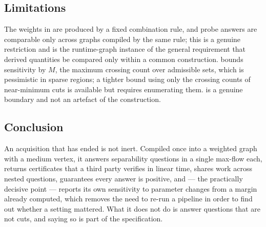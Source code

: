 \documentclass[11pt,a4paper]{article}
\theoremstyle{definition}
\theoremstyle{remark}
\begin{document}
\subsection{Limitations}

The weights in  are produced by a fixed combination rule,
and probe answers are comparable only across graphs compiled by the same
rule; this is a genuine restriction and is the runtime-graph instance of
the general requirement that derived quantities be compared only within a
common construction.  bounds sensitivity by $M$,
the maximum crossing count over admissible sets, which is pessimistic in
sparse regions; a tighter bound using only the crossing counts of
near-minimum cuts is available but requires enumerating them.
 is a genuine boundary and not an artefact of the
construction.

\subsection{Conclusion}

An acquisition that has ended is not inert. Compiled once into a weighted
graph with a medium vertex, it answers separability questions in a single
max-flow each, returns certificates that a third party verifies in linear
time, shares work across nested questions, guarantees every answer is
positive, and --- the practically decisive point --- reports its own
sensitivity to parameter changes from a margin already computed, which
removes the need to re-run a pipeline in order to find out whether a
setting mattered. What it does not do is answer questions that are not
cuts, and saying so is part of the specification.



\end{document}
